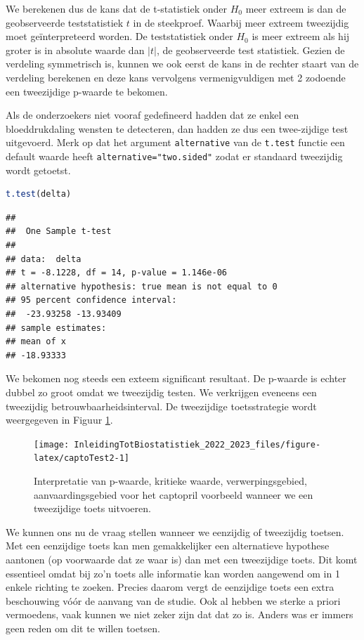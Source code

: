 \documentclass[
  12pt,dutch,coursenotes]{book}
\newcommand{\passthrough}[1]{#1}
\begin{document}
We berekenen dus de kans dat de t-statistiek onder \(H_0\) meer extreem is dan de geobserveerde teststatistiek \(t\) in de steekproef.
Waarbij meer extreem tweezijdig moet geïnterpreteerd worden.
De teststatistiek onder \(H_0\) is meer extreem als hij groter is in absolute waarde dan \(\vert t \vert\), de geobserveerde test statistiek.
Gezien de verdeling symmetrisch is, kunnen we ook eerst de kans in de rechter staart van de verdeling berekenen en deze kans vervolgens vermenigvuldigen met 2 zodoende een tweezijdige p-waarde te bekomen.

Als de onderzoekers niet vooraf gedefineerd hadden dat ze enkel een bloeddrukdaling wensten te detecteren, dan hadden ze dus een twee-zijdige test uitgevoerd.
Merk op dat het argument \passthrough{\lstinline!alternative!} van de \passthrough{\lstinline!t.test!} functie een default waarde heeft \passthrough{\lstinline!alternative="two.sided"!} zodat er standaard tweezijdig wordt getoetst.

\begin{lstlisting}[language=R]
t.test(delta)
\end{lstlisting}

\begin{lstlisting}
## 
##  One Sample t-test
## 
## data:  delta
## t = -8.1228, df = 14, p-value = 1.146e-06
## alternative hypothesis: true mean is not equal to 0
## 95 percent confidence interval:
##  -23.93258 -13.93409
## sample estimates:
## mean of x 
## -18.93333
\end{lstlisting}

We bekomen nog steeds een exteem significant resultaat. De p-waarde is echter dubbel zo groot omdat we tweezijdig testen.
We verkrijgen eveneens een tweezijdig betrouwbaarheidsinterval.
De tweezijdige toetsstrategie wordt weergegeven in Figuur \ref{fig:captoTest2}.

\begin{figure}

{\centering \texttt{[image: InleidingTotBiostatistiek\_2022\_2023\_files/figure-latex/captoTest2-1]} 

}

\caption{Interpretatie van p-waarde, kritieke waarde, verwerpingsgebied, aanvaardingsgebied voor het captopril voorbeeld wanneer we een tweezijdige toets uitvoeren.}\label{fig:captoTest2}
\end{figure}

We kunnen ons nu de vraag stellen wanneer we eenzijdig of tweezijdig toetsen.
Met een eenzijdige toets kan men gemakkelijker een alternatieve hypothese
aantonen (op voorwaarde dat ze waar is) dan met een tweezijdige toets. Dit
komt essentieel omdat bij zo'n toets alle informatie kan worden aangewend om
in 1 enkele richting te zoeken. Precies daarom vergt de eenzijdige toets een
extra beschouwing vóór de aanvang van de studie. Ook al hebben we sterke
a priori vermoedens, vaak kunnen we niet zeker zijn dat dat zo is.
Anders was er immers geen reden om
dit te willen toetsen.
\end{document}

